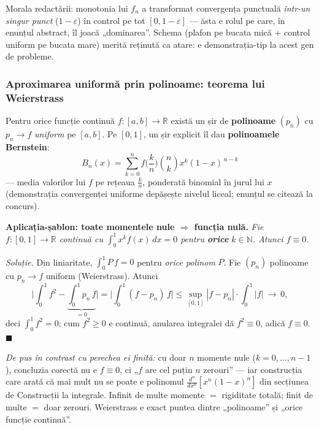 \begin{obs}
Morala redactării: monotonia lui $f_n$ a transformat convergența punctuală \emph{într-un singur punct} ($1-\varepsilon$) în control pe tot $[0,1-\varepsilon]$ --- ăsta e rolul pe care, în enunțul abstract, îl joacă „dominarea''. Schema (plafon pe bucata mică + control uniform pe bucata mare) merită reținută ca atare: e demonstrația-tip la acest gen de probleme.
\end{obs}

\subsubsection{Aproximarea uniformă prin polinoame: teorema lui Weierstrass}

\begin{teorema}
Pentru orice funcție continuă $f:[a,b]\to\mathbb{R}$ există un șir de \textbf{polinoame} $(p_n)$ cu $p_n\to f$ \emph{uniform} pe $[a,b]$. Pe $[0,1]$, un șir explicit îl dau \textbf{polinoamele Bernstein}:
\[
B_n(x)=\sum_{k=0}^{n}f\Big(\frac kn\Big)\binom nk x^{k}(1-x)^{\,n-k}
\]
--- media valorilor lui $f$ pe rețeaua $\frac kn$, ponderată binomial în jurul lui $x$ (demonstrația convergenței uniforme depășește nivelul liceal; enunțul se citează la concurs).
\end{teorema}

\textbf{Aplicația-șablon: toate momentele nule $\Rightarrow$ funcția nulă.} \emph{Fie $f:[0,1]\to\mathbb{R}$ continuă cu $\int_0^1x^{k}f(x)\,dx=0$ pentru \textbf{orice} $k\in\mathbb{N}$. Atunci $f\equiv0$.}

\emph{Soluție.} Din liniaritate, $\int_0^1P\,f=0$ pentru \emph{orice polinom} $P$. Fie $(p_n)$ polinoame cu $p_n\to f$ uniform (Weierstrass). Atunci
\[
\Big|\int_0^1f^{2}-\underbrace{\int_0^1p_n\,f}_{=0}\Big|=\Big|\int_0^1(f-p_n)\,f\Big|\le\sup_{[0,1]}|f-p_n|\cdot\int_0^1|f|\ \longrightarrow\ 0,
\]
deci $\int_0^1f^2=0$; cum $f^2\ge0$ e continuă, anularea integralei dă $f^2\equiv0$, adică $f\equiv0$. $\blacksquare$

\emph{De pus în contrast cu perechea ei finită:} cu doar $n$ momente nule ($k=0,\dots,n-1$), concluzia corectă nu e $f\equiv0$, ci „$f$ are cel puțin $n$ zerouri'' --- iar construcția care arată că mai mult nu se poate e polinomul $\frac{d^n}{dx^n}[x^n(1-x)^n]$ din secțiunea de Construcții la integrale. Infinit de multe momente $=$ rigiditate totală; finit de multe $=$ doar zerouri. Weierstrass e exact puntea dintre „polinoame'' și „orice funcție continuă''.

